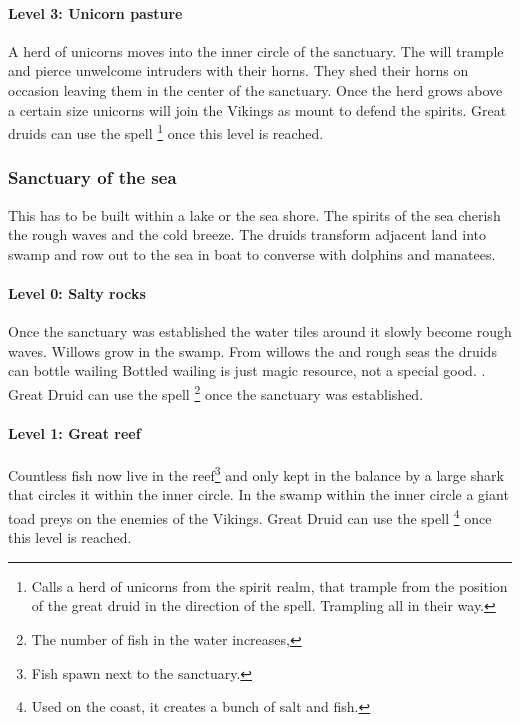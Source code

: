 \paragraph{Level 3: Unicorn pasture}
A herd of unicorns moves into the inner circle of the sanctuary. The will
trample and pierce unwelcome intruders with their horns. They shed their horns
on occasion leaving them in the center of the sanctuary. Once the herd grows
above a certain size unicorns will join the \gls*{Vikings} as mount to defend
the spirits. Great druids can use the spell \footnote{ Calls a herd of unicorns from the spirit realm, that
	trample from the position of the great druid in the direction of the spell.
	Trampling all in their way. } once this level is reached.

\subsubsection{Sanctuary of the sea}\label{ch:Tribes:Vikings:Religion:Sea}
This has to be built within a lake or the sea shore. The spirits of the sea
cherish the rough waves and the cold breeze. The druids transform adjacent land
into swamp and row out to the sea in boat to converse with dolphins and
manatees.

\paragraph{Level 0: Salty rocks}
Once the sanctuary was established the water tiles around it slowly become
rough waves. Willows grow in the swamp. From willows the and rough seas the
druids can bottle wailing{ Bottled wailing is just magic resource, not a
		special good. }. Great Druid can use the spell \footnote{ The number of fish in the water increases, } once the
sanctuary was established.

\paragraph{Level 1: Great reef}
Countless fish now live in the reef\footnote{ Fish spawn next to the sanctuary.
} and only kept in the balance by a large shark that circles it within the
inner circle. In the swamp within the inner circle a giant toad preys on the
enemies of the \gls*{Vikings}. Great Druid can use the spell \footnote{ Used on the coast, it creates a bunch of salt and fish. } once
this level is reached.

